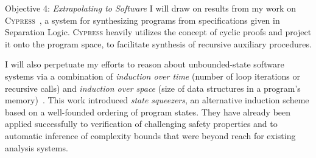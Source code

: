 \begin{paragraph}{Objective 4: {\it Extrapolating to Software}}
I will draw on results from my work on \textsc{Cypress}~\cite{PLDI2021:Itzhaky}, a system for synthesizing programs from specifications given in Separation Logic.
\textsc{Cypress} heavily utilizes the concept of cyclic proofs and project it onto the program space,
to facilitate synthesis of recursive auxiliary procedures.

I will also perpetuate my efforts to reason about unbounded-state software systems via a combination of \emph{induction over time} (number of loop iterations or recursive calls) and \emph{induction over space} (size of data structures in a program's memory)~\cite{VMCAI2020:Ish-Shalom,ESOP2021:Ish-Shalom}.
This work introduced \emph{state squeezers}, an alternative induction scheme based on a well-founded ordering of program states.
They have already been applied successfully to verification of challenging safety properties and to automatic inference of complexity bounds that were beyond reach for existing analysis systems.
\end{paragraph}


\begin{comment}
Another obstacle, which hinders both approaches, is the use of quantification
in assumptions and theorems.
One generally wishes to take advantage of the inherent modularity in proving
most kinds of properties, be those mathematical theorems in algebra or combinatorics,
and definitely when it comes to correctness properties of computer programs.
Software is modular by nature, 
It is very much desirable to adopt the same contributing factor to reasoning about
these programs.
This means that instead of constructing one monolithic proof of the ``ultimate
theorem'', one identifies and proves \emph{lemmas} that abstract and generalize
domain knowledge and understanding of the underlying program --- layering them
up until the final goal is met.
This is definitely how it is done in academic papers, and, more recently, in
large software verification projects.
Going back to the challenge at hand, these auxiliary lemmas typically include
quantified formulas, which are logic's way of expressing generalized conjectures.
Applying these lemmas, \eg in the context of carrying out the next step of the proof,
ultimately requires to instantiate universal quantifiers with logical terms.
Since the space of available terms is large (or even infinite), this becomes
a task that is daunting to automate and requires the employment of heuristics
to select the right instances.
We will move to consolidate instantiation strategies into ones that more closely
matches the search for proof --- thus being goal-directed rather then origin-directed.
A primary aim is to make these strategies less heuristic and more predictable.
\end{comment}


